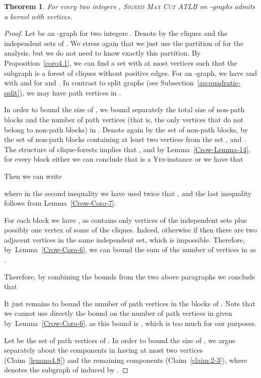 \documentclass[
final
]{dmtcs-episciences}
\newtheorem{theorem}{Theorem}{\bfseries}{\itshape}
\begin{document}
\begin{theorem}\label{thm:quadratic-general}
For every two integers , \textsc{Signed Max Cut ATLB} on -graphs admits a kernel with  vertices.
\end{theorem}
\begin{proof}
Let  be an -graph for two integers . Denote by  the cliques and  the independent sets of .  We stress again that we just use the partition of  for the analysis, but we do not need to know exactly this partition.  By Proposition~\ref{coro4.1}, we can find a set  with at most  vertices such that the subgraph  is a forest of cliques without positive edges. For an -graph, we have  and  with  and  for  and . In contrast to split graphs (see  Subsection~\ref{ap:quadratic-split}), we may have path vertices in .

In order to bound the size of , we bound separately the total size of non-path blocks and the number of path vertices (that is, the only vertices that do not belong to non-path blocks) in . Denote again by  the set of non-path blocks, by  the set of non-path blocks containing at least two vertices  from the set , and .
	The structure of clique-forests implies that , and by Lemma~\ref{Crow-Lemma-14}, for every block  either we can conclude that  is a \textsc{Yes}-instance or we have that 

Then we can write

where in the second inequality we have used twice that , and the last inequality follows from Lemma~\ref{Crow-Coro-7}.


For each block  we have , as  contains only vertices of the  independent sets  plus possibly one vertex of some of the cliques. Indeed, otherwise if   then there are two adjacent vertices in the same independent set, which is impossible. Therefore, by~Lemma~\ref{Crow-Coro-6}, we can bound  the sum of the number of vertices in  as .

Therefore, by combining the bounds from the two above paragraphs we conclude that


It just remains to bound the number of path vertices in the blocks of . Note that we cannot use directly the bound on the number of path vertices in  given by~Lemma~\ref{Crow-Coro-6}, as this bound is , which is too much for our purposes.

Let  be the set of path vertices of . In order to bound the size of , we argue separately about the components in  having at most two vertices (Claim~\ref{lemma4.8}) and the remaining components (Claim~\ref{claim:2-3}), where  denotes the subgraph of  induced by .


\end{proof}
\end{document}
